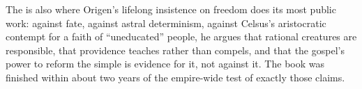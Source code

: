 The  is also where Origen's lifelong insistence on
freedom does its most public work: against fate, against astral
determinism, against Celsus's aristocratic contempt for a faith of
``uneducated'' people, he argues that rational creatures are responsible,
that providence teaches rather than compels, and that the gospel's power to
reform the simple is evidence for it, not against it. The book was finished
within about two years of the empire-wide test of exactly those claims.
